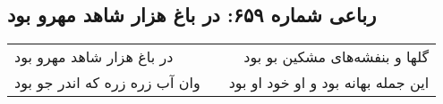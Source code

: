 \begin{center}
\section*{رباعی شماره ۶۵۹: در باغ هزار شاهد مهرو بود}
\label{sec:0659}
\begin{longtable}{l p{0.5cm} r}
در باغ هزار شاهد مهرو بود
&&
گلها و بنفشه‌های مشکین بو بود
\\
وان آب زره زره که اندر جو بود
&&
این جمله بهانه بود و او خود او بود
\\
\end{longtable}
\end{center}

